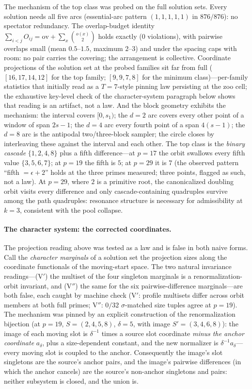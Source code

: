 The mechanism of the top class was probed on the full solution sets.
Every solution needs all five arcs (essential-arc pattern
$(1,1,1,1,1)$ in $876/876$): no spectator redundancy. The
overlap-budget identity
$\sum_{i<j}O_{ij}=\mathrm{ov}+\sum_x\binom{o(x)}{2}$ holds exactly
($0$ violations), with pairwise overlaps small (mean $0.5$--$1.5$,
maximum $2$--$3$) and under the spacing caps with room: no pair
carries the covering; the arrangement is collective. Coordinate
projections of the solution set at the probed families sit far from
full ($[16,17,14,12]$ for the top family; $[9,9,7,8]$ for the minimum
class)---per-family statistics that initially read as a $T=7$-style
pinning law persisting at the zoo cell; the exhaustive key-level check
of the character-system paragraph below shows that reading is an
artifact, not a law. And the block geometry exhibits
the mechanism: the interval covers $[0,s_1)$; the $d=2$ arc covers
every other point of a window of span $2s-1$; the $d=4$ arc every
fourth point of a span $4(s-1)$; the $d=8$ arc is the antipodal
two/three-block sampler; the circle closes by interleaving these
against the interval and each other. The top class is the
\emph{binary cascade} $\{1,2,4,8\}$ plus a fifth difference---at
$p=17$ the orbit swallows every fifth value $\{3,5,6,7\}$; at $p=19$
the fifth is $5$; at $p=29$ it is $7$ (the observed pattern
``fifth $=\epsilon+2$'' holds at the three primes measured; three
points, flagged as such, not a law). At $p=29$, where $2$ is a
primitive root, the canonicalized doubling orbit visits every
difference and only cascade-containing quadruples survive among the
path quadruples: resonance structure is necessary for admissibility at
$k=3$, consistent with the pool collapse.

\paragraph{The character system: the corrected coordinates.}
The projection reading above was tested as a law and is false in both
naive forms. Call the \emph{character marginals} of a solution set the
projection sizes along the coordinate functionals of the moving-start
space. The two natural invariance readings---(V$'$) the multiset of the
four singleton marginals is a renormalization-orbit invariant, and
(V$''$) the same for the six pairwise-difference marginals---are both
false, each caught by machine check (V$'$: profile multisets differ
across orbit members at both full primes; V$''$: $0/32$
$\sigma$-matched size tuples agree at $p=19$). The mechanism was
pinned by an explicit construction of the renormalization bijection
(at $p=19$, $S=(2,4,5,8)$, $\delta=5$, with image $S'=(3,4,6,8)$):
the image of each moving slot is $\delta^{-1}$ times a source slot
coordinate \emph{minus the anchor coordinate} $a_\delta$, plus a
size-dependent constant, and the new normalizer is
$\delta^{-1}a_\delta$---every moving slot is coupled to the anchor.
Consequently the image's slot singletons are the source's anchor pairs,
and the image's pairwise differences (in which the anchor cancels) are
the source's non-anchor singletons and pairs: neither subsystem is
closed, and the union is.

